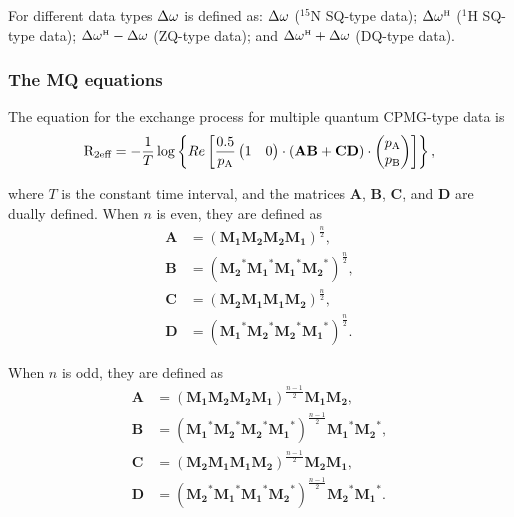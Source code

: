 For different data types $\Delta\omega$ is defined as:  $\Delta\omega$ ($^{15}$N SQ-type data);  $\Delta\omega^{\scriptscriptstyle\mathrm{H}}$ ($^1$H SQ-type data); $\Delta\omega^{\scriptscriptstyle\mathrm{H}} - \Delta\omega$ (ZQ-type data); and $\Delta\omega^{\scriptscriptstyle\mathrm{H}} + \Delta\omega$ (DQ-type data).



\subsubsection{The MQ equations}

The equation for the exchange process for multiple quantum CPMG-type data is 
\begin{equation}
    \mathrm{R}_{\textrm{2eff}} = - \frac{1}{T}
                 \log \left\{ Re \left[ \frac{0.5}{p_{\textrm{A}}}
                     \begin{pmatrix}1&0\end{pmatrix} \cdot \left( \mathbf{AB} + \mathbf{CD} \right) \cdot \begin{pmatrix}p_{\textrm{A}}\\p_{\textrm{B}}\end{pmatrix}
                 \right] \right\},
\end{equation}

where $T$ is the constant time interval, and the matrices $\mathbf{A}$, $\mathbf{B}$, $\mathbf{C}$, and $\mathbf{D}$ are dually defined.
When $n$ is even, they are defined as 
\begin{subequations}
\begin{align}
    \mathbf{A} &= \left( \mathbf{M_1} \mathbf{M_2} \mathbf{M_2} \mathbf{M_1} \right)^{\frac{n}{2}}, \\
    \mathbf{B} &= \left( \mathbf{M_2}^* \mathbf{M_1}^* \mathbf{M_1}^* \mathbf{M_2}^* \right)^{\frac{n}{2}}, \\
    \mathbf{C} &= \left( \mathbf{M_2} \mathbf{M_1} \mathbf{M_1} \mathbf{M_2} \right)^{\frac{n}{2}}, \\
    \mathbf{D} &= \left( \mathbf{M_1}^* \mathbf{M_2}^* \mathbf{M_2}^* \mathbf{M_1}^* \right)^{\frac{n}{2}}.
\end{align}
\end{subequations}

When $n$ is odd, they are defined as
\begin{subequations}
\begin{align}
    \mathbf{A} &= \left( \mathbf{M_1} \mathbf{M_2} \mathbf{M_2} \mathbf{M_1} \right)^{\frac{n-1}{2}} \mathbf{M_1} \mathbf{M_2}, \\
    \mathbf{B} &= \left( \mathbf{M_1}^* \mathbf{M_2}^* \mathbf{M_2}^* \mathbf{M_1}^* \right)^{\frac{n-1}{2}} \mathbf{M_1}^* \mathbf{M_2}^*, \\
    \mathbf{C} &= \left( \mathbf{M_2} \mathbf{M_1} \mathbf{M_1} \mathbf{M_2} \right)^{\frac{n-1}{2}} \mathbf{M_2} \mathbf{M_1}, \\
    \mathbf{D} &= \left( \mathbf{M_2}^* \mathbf{M_1}^* \mathbf{M_1}^* \mathbf{M_2}^* \right)^{\frac{n-1}{2}} \mathbf{M_2}^* \mathbf{M_1}^*.
\end{align}
\end{subequations}

